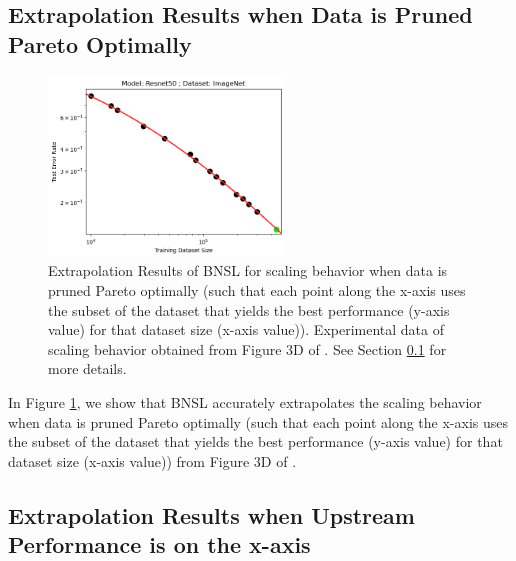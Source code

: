 \documentclass{article} %
\begin{document}
\subsection{Extrapolation Results when Data is Pruned Pareto Optimally}
\label{section:data_prune}

\begin{figure}[htbp]
    \centering
\includegraphics[width=0.56\textwidth]{figures/data_prune/resnet50_imagenet.png}

    \caption{
    Extrapolation Results of BNSL for scaling behavior when data is pruned Pareto optimally (such that each point along the x-axis uses the subset of the dataset that yields the best performance (y-axis value) for that dataset size (x-axis value)). Experimental data of scaling behavior obtained from Figure 3D of \cite{https://doi.org/10.48550/arxiv.2206.14486}. See Section \ref{section:data_prune} for more details.
    }
    \label{fig:data_prune}
\end{figure}

In Figure \ref{fig:data_prune}, we show that BNSL accurately extrapolates the scaling behavior when data is pruned Pareto optimally (such that each point along the x-axis uses the subset of the dataset that yields the best performance (y-axis value) for that dataset size (x-axis value)) from Figure 3D of \cite{https://doi.org/10.48550/arxiv.2206.14486}.

\FloatBarrier

\subsection{Extrapolation Results when Upstream Performance is on the x-axis}
\label{section:downstream_from_upstream}
\end{document}
